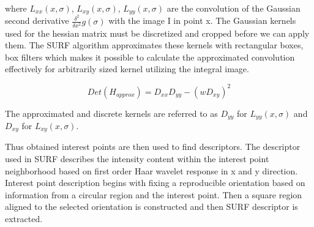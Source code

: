 \documentclass[journal,twoside]{IEEEtran}
\begin{document}
    where \(L_{xx}\left(x, \sigma\right)\), \(L_{xy}\left(x, \sigma\right)\), \(L_{yy}\left(x, \sigma\right)\) 
    are the convolution of the Gaussian second derivative \(\frac{\delta^2}{\delta x^2}g\left(\sigma\right)\) with the image I in point x. 
    The Gaussian kernels used for the hessian matrix
    must be discretized and cropped before we can apply them.
    The SURF algorithm approximates these kernels with
    rectangular boxes, box filters which makes it possible to
    calculate the approximated convolution effectively for
    arbitrarily sized kernel utilizing the integral image.

    \begin{equation}
        Det(H_{approx})=D_{xx}D_{yy} - (wD_{xy})^2
    \end{equation}

    The approximated and discrete kernels are referred to as
    \(D_{yy}\) for \(L_{yy}(x, \sigma)\) and \(D_{xy}\) for \(L_{xy} (x, \sigma)\). \cite{Bay2006}

    Thus obtained interest points are then used to find
    descriptors. The descriptor used in SURF describes the
    intensity content within the interest point neighborhood based
    on first order Haar wavelet \cite{Grauman2011} response in x and y direction.
    Interest point description begins with fixing a reproducible
    orientation based on information from a circular region and
    the interest point. Then a square region aligned to the selected
    orientation is constructed and then SURF descriptor is
    extracted.
\end{document}
